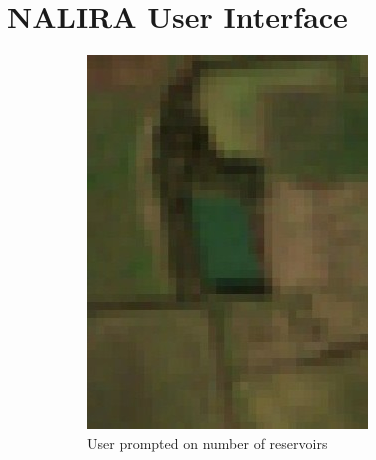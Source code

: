 \section{NALIRA User Interface}
\begin{figure}
     \centering
     \begin{subfigure}[b]{0.3\textwidth}
         \centering
         \includegraphics[width=\linewidth]{contents/figures/LR 10m res.jpg}
         \caption{User prompted on number of reservoirs}
         \label{fig:ipdgs ui first prompt}
     \end{subfigure}
     \hfill
     \begin{subfigure}[b]{0.3\textwidth}
         \centering

\end{subfigure}
\end{figure}
